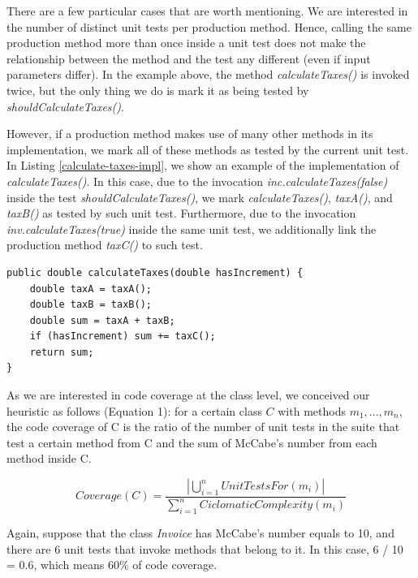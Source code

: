 \documentclass{sig-alternate}
\begin{document}
There are a few particular cases that are worth mentioning. We are interested in the number 
of distinct unit tests per production method. Hence, calling the same production method
more than once inside a unit test does not make the relationship between the method 
and the test any different (even if input parameters differ). In the example above, the 
method \textit{calculateTaxes()} is invoked twice, but the only thing we do is mark it 
as being tested by \textit{shouldCalculateTaxes()}.

However, if a production method makes use of many other methods in its implementation,
we mark all of these methods as tested by the current unit test. In Listing \ref{calculate-taxes-impl},
we show an example of the implementation of \textit{calculateTaxes()}. In this case, due to the 
invocation \textit{inc.calculateTaxes(false)} inside the test \textit{shouldCalculateTaxes()}, 
we mark \textit{calculateTaxes()}, \textit{taxA()}, and \textit{taxB()} as tested 
by such unit test. Furthermore, due to the invocation \textit{inv.calculateTaxes(true)} inside
the same unit test, we additionally link the production method \textit{taxC()} to such test.

\begin{lstlisting}
public double calculateTaxes(double hasIncrement) {
	double taxA = taxA();
	double taxB = taxB();
	double sum = taxA + taxB;
	if (hasIncrement) sum += taxC();
	return sum;
}
\end{lstlisting}

As we are interested in code coverage at the class level, 
we conceived our heuristic as follows (Equation 1): for a certain class $C$ with methods $m_1, ..., m_n$, 
the code coverage of C is the ratio of the number of unit tests in the suite that test a certain method from C and 
the sum of McCabe's number from each method inside C.

\begin{equation}
Coverage(C) = \frac{|\bigcup_{i=1}^{n}UnitTestsFor(m_i)|}{\sum_{i=1}^{n}{CiclomaticComplexity(m_i)}}
\end{equation}

Again, suppose that the class \textit{Invoice} has McCabe's number equals to 10, 
and there are 6 unit tests that invoke methods that belong to it. 
In this case, 6 / 10 = 0.6, which means 60\% of code coverage.
\end{document}
